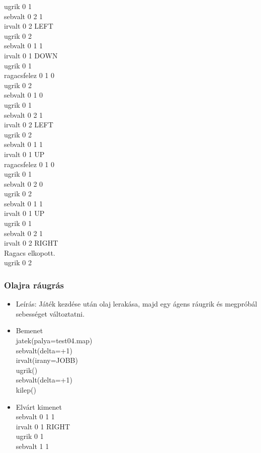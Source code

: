 \begin{itemize}
    ugrik 0 1 \\
    sebvalt 0 2 1 \\
    irvalt 0 2 LEFT \\
    ugrik 0 2 \\
    sebvalt 0 1 1 \\
    irvalt 0 1 DOWN \\
    ugrik 0 1 \\
    ragacsfelez 0 1 0 \\
    ugrik 0 2 \\
    sebvalt 0 1 0 \\
    ugrik 0 1 \\
    sebvalt 0 2 1 \\
    irvalt 0 2 LEFT \\
    ugrik 0 2 \\
    sebvalt 0 1 1 \\
    irvalt 0 1 UP \\
    ragacsfelez 0 1 0 \\
    ugrik 0 1 \\
    sebvalt 0 2 0 \\
    ugrik 0 2 \\
    sebvalt 0 1 1 \\
    irvalt 0 1 UP \\
    ugrik 0 1 \\
    sebvalt 0 2 1 \\
    irvalt 0 2 RIGHT \\
    Ragacs elkopott.\\ 
    ugrik 0 2\\
\end{itemize}

\subsubsection{Olajra ráugrás}
\begin{itemize}
  \item Leírás: Játék kezdése után olaj lerakása, majd egy ágens ráugrik és megpróbál sebességet változtatni. 
  \item Bemenet\\ 
    jatek(palya=test04.map)\\
    sebvalt(delta=+1)\\
    irvalt(irany=JOBB)\\
    ugrik()\\
    sebvalt(delta=+1)\\
    kilep()\\
  \item Elvárt kimenet\\
    sebvalt 0 1 1 \\
    irvalt 0 1 RIGHT \\
    ugrik 0 1 \\
    sebvalt 1 1 \\
    

\end{itemize}

